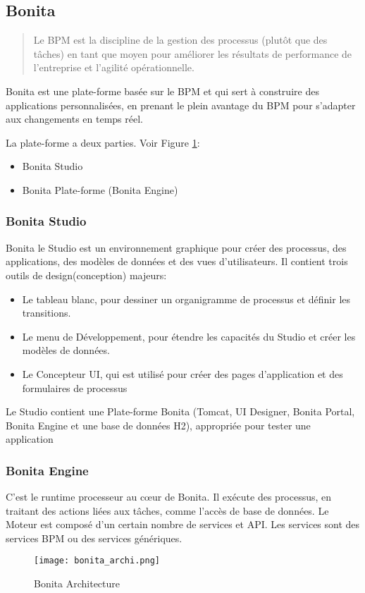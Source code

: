 \subsection{Bonita}
\begin{quotation}
Le BPM est la discipline de la gestion des processus (plutôt que des tâches) en tant que moyen pour améliorer les résultats de performance de l'entreprise et l'agilité opérationnelle. \cite{gartner_glossary}
\end{quotation}

Bonita est une plate-forme basée sur le BPM et qui sert à construire des applications personnalisées, en prenant le plein avantage du BPM pour s'adapter aux changements en temps réel.

La plate-forme a deux parties. Voir Figure \ref{fig:bonita_archi}:
\begin{itemize}
  \item Bonita Studio
  \item Bonita Plate-forme (Bonita Engine)
\end{itemize}

\subsubsection{Bonita Studio}
Bonita le Studio est un environnement graphique pour créer des processus, des applications, des modèles de données et des vues d'utilisateurs. Il contient trois outils de design(conception) majeurs:

\begin{itemize}
  \item Le tableau blanc, pour dessiner un organigramme de processus et définir les transitions.
  \item Le menu de Développement, pour étendre les capacités du Studio et créer les modèles de données.
  \item Le Concepteur UI, qui est utilisé pour créer des pages d'application et des formulaires de processus
\end{itemize}

Le Studio contient une Plate-forme Bonita (Tomcat, UI Designer, Bonita Portal, Bonita Engine et une base de données H2), appropriée pour tester une application

\subsubsection{Bonita Engine}
C'est le runtime processeur au cœur de Bonita. Il exécute des processus, en traitant des actions liées aux tâches, comme l'accès de base de données. Le Moteur est composé d'un certain nombre de services et API. Les services sont des services BPM ou des services génériques.

\begin{figure}[!ht]
\centering
\texttt{[image: bonita\_archi.png]}
\caption{Bonita Architecture}
\label{fig:bonita_archi}
\end{figure}
